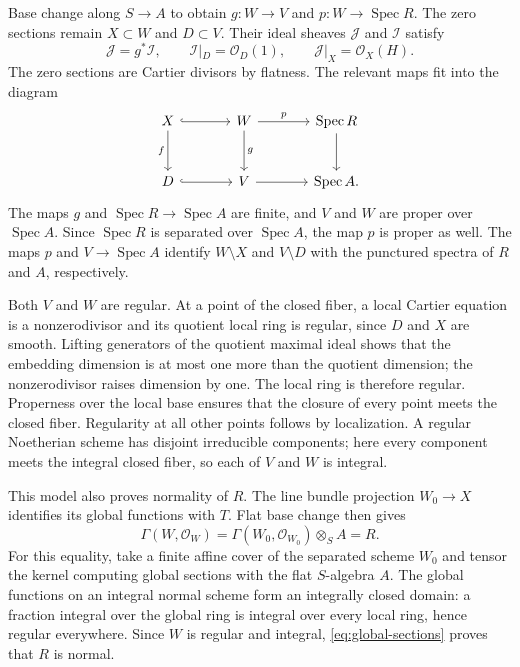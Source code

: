 \documentclass[11pt]{article}
\theoremstyle{remark}
\newcommand{\cO}{\mathcal O}
\newcommand{\cI}{\mathcal I}
\newcommand{\cJ}{\mathcal J}
\DeclareMathOperator{\Spec}{Spec}
\begin{document}
Base change along $S\to A$ to obtain $g:W\to V$ and
$p:W\to\Spec R$. The zero sections remain $X\subset W$ and $D\subset V$.
Their ideal sheaves $\cJ$ and $\cI$ satisfy
\begin{equation}\label{eq:conormal}
 \cJ=g^*\cI,\qquad \cI|_D=\cO_D(1),\qquad
 \cJ|_X=\cO_X(H).
\end{equation}
The zero sections are Cartier divisors by flatness. The relevant maps
fit into the diagram
\[
\begin{tikzcd}[column sep=large,row sep=large]
 X \arrow[r,hook] \arrow[d,"f"'] & W \arrow[r,"p"] \arrow[d,"g"]
 & \Spec R \arrow[d] \\
 D \arrow[r,hook] & V \arrow[r] & \Spec A .
\end{tikzcd}
\]
The maps $g$ and $\Spec R\to\Spec A$ are finite, and $V$ and $W$ are
proper over $\Spec A$. Since $\Spec R$ is separated over $\Spec A$,
the map $p$ is proper as well. The maps $p$ and $V\to\Spec A$ identify
$W\setminus X$ and $V\setminus D$ with the punctured spectra of $R$
and $A$, respectively.

Both $V$ and $W$ are regular. At a point of the closed fiber, a local
Cartier equation is a nonzerodivisor and its quotient local ring is
regular, since $D$ and $X$ are smooth. Lifting generators of the quotient
maximal ideal shows that the embedding dimension is at most one more
than the quotient dimension; the nonzerodivisor raises dimension by
one. The local ring is therefore regular. Properness over the local
base ensures that the closure of every point meets the closed fiber.
Regularity at all other points follows by localization. A regular
Noetherian scheme has disjoint irreducible components; here every
component meets the integral closed fiber, so each of $V$ and $W$ is
integral.

This model also proves normality of $R$. The line bundle projection
$W_0\to X$ identifies its global functions with $T$.
Flat base change \cite[Tag 02KH]{Stacks} then gives
\begin{equation}\label{eq:global-sections}
 \Gamma(W,\cO_W)=\Gamma(W_0,\cO_{W_0})\otimes_S A=R.
\end{equation}
For this equality, take a finite affine cover of the separated scheme
$W_0$ and tensor the kernel computing global sections with the flat
$S$-algebra $A$. The global functions on an integral normal scheme form
an integrally closed domain: a fraction integral over the global ring
is integral over every local ring, hence regular everywhere.
Since $W$ is regular and integral, \eqref{eq:global-sections} proves
that $R$ is normal.
\end{document}
